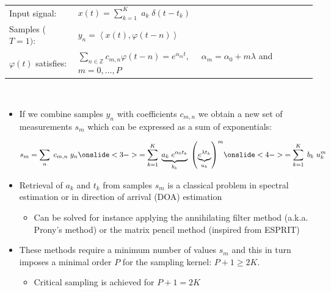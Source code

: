 \documentclass[8pt]{beamer}
\begin{document}
\begin{frame}

\vspace{.2cm}
\begin{tabular}{ll}
Input signal:                      & $x(t) = \sum_{k=1}^{K} \; a_k \; \delta(t-t_k)$\\[.2cm]
Samples ($T=1)$:                   & $y_n = \left\langle x(t), \varphi(t - n) \right\rangle$\\[.2cm]
$\varphi(t)$ satisfies:            & $\sum_{n \in \mathbb{Z}} c_{m,n} \varphi(t-n) = e^{\alpha_mt}, \quad$
                                     $\alpha_m = \alpha_0 + m \lambda$ and $m=0,\ldots,P$
\end{tabular}
\\[.4cm]

\begin{itemize}

\item<2->
If we combine samples $y_n$ with coefficients $c_{m,n}$ we obtain a new set of 
measurements $s_m$ which can be expressed as a sum of exponentials:
\begin{small}
\begin{equation*}
s_m 
  = \sum_{n} \; c_{m,n} \; y_n
\onslide<3->{
  = \sum_{k=1}^{K} \; \underbrace{a_k \; e^{\alpha_0 t_k}}_{b_k} 
                   \; \left( \underbrace{e^{\lambda t_k}}_{u_k} \right)^m}
\onslide<4->{
  = \sum_{k=1}^{K} \; b_k \; u_k^m}
\end{equation*}
\end{small}

\item<5->
Retrieval of $a_k$ and $t_k$ from samples $s_m$ is a classical problem in spectral
estimation or in direction of arrival (DOA) estimation
\begin{itemize}
\item Can be solved for instance applying the annihilating filter method (a.k.a. Prony's method)
or the matrix pencil method (inspired from ESPRIT)
\\[.4cm]
\end{itemize}

\item<6-> These methods require a minimum number of values $s_m$ and this in turn 
imposes a minimal order $P$ for the sampling kernel: $P+1 \geq 2K$.
\begin{itemize}
\item Critical sampling is achieved for $P+1 = 2K$
\\[.4cm]
\end{itemize}


\end{itemize}
\end{frame}
\end{document}
